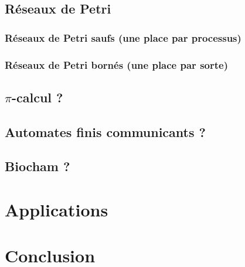 \documentclass[a4paper]{report}
\begin{document}
  \section{Réseaux de Petri}
    \subsection{Réseaux de Petri saufs (une place par processus)}
    \subsection{Réseaux de Petri bornés (une place par sorte)}
  \section{$\pi$-calcul ?}
  \section{Automates finis communicants ?}
  \section{Biocham ?}

\chapter{Applications}

\chapter{Conclusion}
\end{document}
